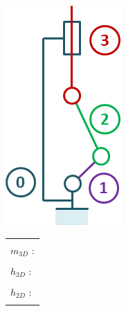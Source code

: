 \documentclass[10pt,fleqn]{article} %
\begin{document}
\begin{multicols}{2}
\begin{minipage}[c]{.45\linewidth}
\begin{center}
\includegraphics[width=.8\linewidth]{images/cas_06.png}
\end{center}
\end{minipage} \hfill
\begin{minipage}[c]{.5\linewidth}
\begin{center}
\begin{tabular}{|p{3cm}|}
\hline 
\\
$m_{3D}$ : \\
\\
$h_{3D}$ : \\
\\
$h_{2D}$ : \\
\\
\hline
\end{tabular}
\end{center}
\end{minipage}



\end{multicols}
\end{document}
